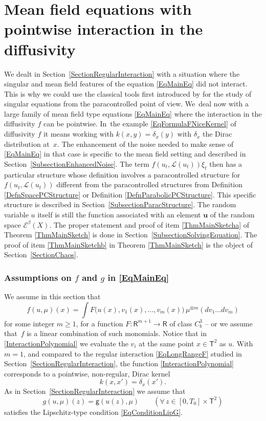 \documentclass[JEP,XML,SOM,Unicode,published]{cedram}
\theoremstyle{definition}
\newcommand\bbR{\mathbf{\mathsf{R}}}
\newcommand{\mcE}{\mathcal{E}}
\newcommand{\mcL}{\mathcal{L}}
\newcommand{\bsu}{\boldsymbol{u}}
\begin{document}
\section{Mean field equations with pointwise interaction in the diffusivity}
\label{SectionGeneral}

We dealt in Section~\ref{SectionRegularInteraction} with a situation where the singular and mean field features of the equation \eqref{EqMainEq} did not interact. This is why we could use the classical tools first introduced by \cite{GIP} for the study of singular equations from the paracontrolled point of view. We~deal now with a large family of mean field type equations \eqref{EqMainEq} where the interaction in the diffusivity $f$ can be pointwise. In~the example \eqref{EqFormulaFNiceKernel} of diffusivity $f$ it means working with $k(x,y)=\delta_x(y)$ with $\delta_x$ the Dirac distribution at~$x$. The enhancement of the noise needed to make sense of \eqref{EqMainEq} in that case is specific to the mean field setting and described in Section~\ref{SubsectionEnhancedNoise}. The term $f(u_t,\mcL(u_t))\xi_t$ then has a particular structure whose definition involves a paracontrolled structure for $f(u_t,\mcL(u_t))$ different from the paracontrolled structures from Definition \ref{DefnSpacePCStructure} or Definition \ref{DefnParabolicPCStructure}. This specific structure is described in Section~\ref{SubsectionParacStructure}. The random variable $u$ itself is still the function associated with an element $\bsu$ of the random space $\mcE^\beta(X)$. The proper statement and proof of item \eqref{ThmMainSketcha} of Theorem \ref{ThmMainSketch} is done in Section~\ref{SubsectionSolvingEquation}. The proof of item \eqref{ThmMainSketchb} in Theorem \ref{ThmMainSketch} is the object of Section~\ref{SectionChaos}.

\subsubsection*{Assumptions on $f$ and $g$ in \eqref{EqMainEq}} We assume in this section that
\begin{equation} \label{InteractionPolynomial}
f(u,\mu)(x) = \int F\bigl(u(x), v_1(x), \dots, v_m(x)\bigr) \, \mu^{\otimes m}(dv_1\dots dv_m)
\end{equation}
for some integer $m\geq1$, for a function $F : \bbR^{m+1}\to\bbR$ of class $C^3_b$ -- or we assume that~$f$ is a linear combination of such monomials. Notice that in \eqref{InteractionPolynomial} we evaluate the $v_i$ at the same point $x\in\mathsf{T}^2$ as $u$. With $m=1$, and compared to the regular interaction \eqref{EqLongRangeF} studied in Section~\ref{SectionRegularInteraction}, the function \eqref{InteractionPolynomial} corresponds to a pointwise, non-regular, Dirac kernel
\[
k(x,x')=\delta_x(x').
\]
As in Section~\ref{SectionRegularInteraction} we assume that
\begin{equation} \label{EqStructuralAssumptionG}
g(u,\mu)(z) = \mathsf{g}(u(z),\mu) \qquad (\forall\,z\in [0,T_0]\times \mathsf{T}^2)
\end{equation}
satisfies the Lipschitz-type condition \eqref{EqConditionLipG}.
\end{document}
